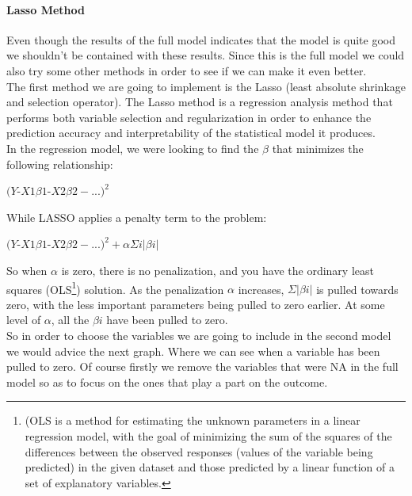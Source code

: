 \documentclass{article}
\begin{document}
\paragraph{Lasso Method}
Even though the results of the full model indicates that the model is quite good we shouldn't be contained with these results. Since this is the full model we could also try some other methods in order to see if we can make it even better.\\
The first method we are going to implement is the Lasso (least absolute shrinkage and selection operator). The Lasso method is a regression analysis method that performs both variable selection and regularization in order to enhance the prediction accuracy and interpretability of the statistical model it produces.\\
In the regression model, we were looking to find the $β$ that minimizes the following relationship:
\begin{center}
$(Y${-}$X1\beta 1${-}$X2\beta 2−...)^{2}$
\end{center}
While LASSO applies a penalty term to the problem:
\begin{center}
$(Y${-}$X1\beta 1${-}$X2\beta 2−...)^{2}+\alpha\Sigma i|\beta i|$
\end{center}
So when $\alpha$ is zero, there is no penalization, and you have the ordinary least squares (OLS\footnote{(OLS is a method for estimating the unknown parameters in a linear regression model, with the goal of minimizing the sum of the squares of the differences between the observed responses (values of the variable being predicted) in the given dataset and those predicted by a linear function of a set of explanatory variables.}) solution. As the penalization $\alpha$ increases, $\Sigma|\beta i|$ is pulled towards zero, with the less important parameters being pulled to zero earlier. At some level of $\alpha$, all the $βi$ have been pulled to zero.\\
So in order to choose the variables we are going to include in the second model we would advice the next graph. Where we can see when a variable has been pulled to zero. Of course firstly we remove the variables that were NA in the full model so as to focus on the ones that play a part on the outcome. 
\end{document}
